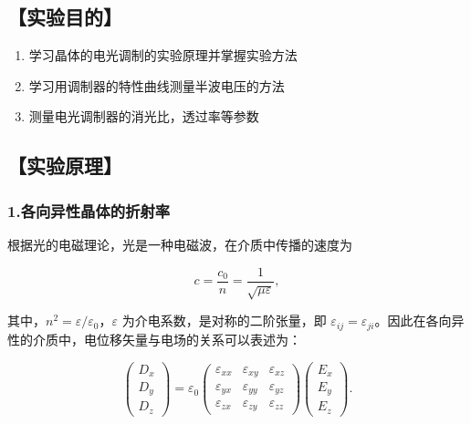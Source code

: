 \documentclass[12pt,a4paper,UTF8]{ctexart}
\begin{document}

\subsection*{【实验目的】}

\begin{enumerate}[(1)]
	\item 学习晶体的电光调制的实验原理并掌握实验方法
	\item 学习用调制器的特性曲线测量半波电压的方法
	\item 测量电光调制器的消光比，透过率等参数
\end{enumerate}


\subsection*{【实验原理】}

\subsubsection*{1.各向异性晶体的折射率}
	根据光的电磁理论，光是一种电磁波，在介质中传播的速度为

	\begin{equation}
	    c = \frac{c_0}{n} = \frac{1}{\sqrt{\mu \varepsilon}},
	\end{equation}

	其中，$n^2 = \varepsilon / \varepsilon_0$，$\varepsilon$ 为介电系数，是对称的二阶张量，即 $\varepsilon_{ij} = \varepsilon_{ji}$。因此在各向异性的介质中，电位移矢量与电场的关系可以表述为：
	
	\begin{equation}
	    \begin{pmatrix} D_x \\ D_y \\ D_z \end{pmatrix} = \varepsilon_0 \begin{pmatrix} \varepsilon_{xx} & \varepsilon_{xy} & \varepsilon_{xz} \\ \varepsilon_{yx} & \varepsilon_{yy} & \varepsilon_{yz} \\ \varepsilon_{zx} & \varepsilon_{zy} & \varepsilon_{zz} \end{pmatrix} \begin{pmatrix} E_x \\ E_y \\ E_z \end{pmatrix}.
	\end{equation}
\end{document}
